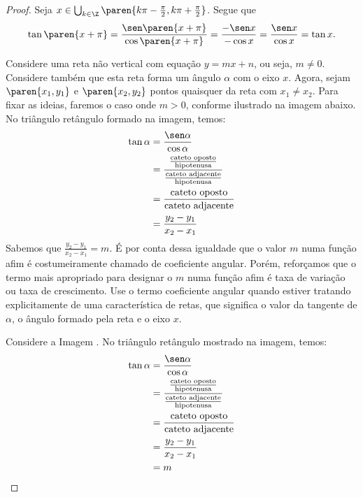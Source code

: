 \begin{proof}
  \item Seja $x \in \bigcup_{k \in \Z} \paren{k \pi - \frac{\pi} 2, k \pi + \frac {\pi} 2}$. Segue que $$\tan \paren{x+\pi} = \frac{\sen \paren{x+\pi}}{\cos \paren{x+\pi}}= \frac{-\sen x}{-\cos x}= \frac{\sen x}{\cos x}= \tan x.$$
  \item Considere uma reta não vertical com equação $y=mx+n$, ou seja, $m \neq 0$. Considere também que esta reta forma um ângulo $\alpha$ com o eixo $x$. Agora, sejam $\paren {x_1, y_1}$ e $\paren{x_2, y_2}$ pontos quaisquer da reta com $x_1 \neq x_2$. Para fixar as ideias, faremos o caso onde $m>0$, conforme ilustrado na imagem abaixo.
  No triângulo retângulo formado na imagem, temos:
  \begin{align*}
    \tan \alpha &= \frac {\sen\alpha}{\cos\alpha} \\ 
    &= \frac{ \frac{\text{cateto oposto}}{\text{hipotenusa}}   }{\frac{\text{cateto adjacente}}{\text{hipotenusa}}} \\
    &= \frac{\text{cateto oposto}}{\text{cateto adjacente}}\\
    &= \frac{y_2 - y_1}{x_2 - x_1}
  \end{align*}
  Sabemos que $\frac{y_2 - y_1}{x_2 - x_1} = m$. %
  É por conta dessa igualdade que o valor $m$ numa função afim é costumeiramente chamado de coeficiente angular. Porém, reforçamos que o termo mais apropriado para designar o $m$ numa função afim é taxa de variação ou taxa de crescimento. Use o termo coeficiente angular quando estiver tratando explicitamente de uma característica de retas, que significa o valor da tangente de $\alpha$, o ângulo formado pela reta e o eixo $x$.
  
  Considere a Imagem . %
  No triângulo retângulo mostrado na imagem, temos:
  \begin{align*}
    \tan \alpha &= \frac {\sen\alpha}{\cos\alpha} \\ 
    &= \frac{ \frac{\text{cateto oposto}}{\text{hipotenusa}}   }{\frac{\text{cateto adjacente}}{\text{hipotenusa}}} \\
    &= \frac{\text{cateto oposto}}{\text{cateto adjacente}}\\
    &= \frac{y_2 - y_1}{x_2 - x_1} \\ &= m
  \end{align*}
  \item %
\end{proof}